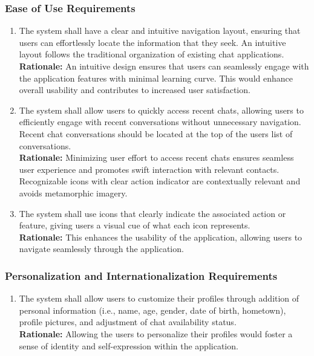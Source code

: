 \documentclass[]{article}
\begin{document}
\subsubsection{Ease of Use Requirements}
\label{ssub:ease_of_use_requirements}
\begin{enumerate}[{UH-EOU}1. ]
	\item The system shall have a clear and intuitive navigation layout, ensuring that users can effortlessly locate 
	the information that they seek. An intuitive layout follows the traditional organization of existing chat applications. \\
	{\bf Rationale:} An intuitive design ensures that users can seamlessly engage with the application features with minimal learning curve. 
	This would enhance overall usability and contributes to increased user satisfaction. 
	\item The system shall allow users to quickly access recent chats, allowing users to efficiently engage with recent 
	conversations without unnecessary navigation. Recent chat conversations should be located at the top of the users list of conversations.\\
	{\bf Rationale:} Minimizing user effort to access recent chats ensures seamless user experience and promotes swift interaction 
	with relevant contacts. Recognizable icons with clear action indicator are contextually relevant and avoids metamorphic imagery. 
	\item The system shall use icons that clearly indicate the associated action or feature, giving users a visual cue of what each icon represents. \\
	{\bf Rationale:} This enhances the usability of the application, allowing users to navigate seamlessly through the application. 
\end{enumerate} 


\subsubsection{Personalization and Internationalization Requirements}
\label{ssub:personalization_and_internationalization_requirements}
\begin{enumerate}[{UH-PI}1. ]
	\item The system shall allow users to customize their profiles through addition of personal information (i.e., name, age, gender, date of birth, hometown), profile pictures, and adjustment of chat availability status. \\
	{\bf Rationale:} Allowing the users to personalize their profiles would foster a sense of identity and self-expression within the application.
\end{enumerate}
\end{document}

